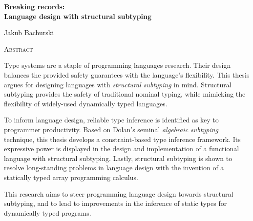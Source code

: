 \vspace*{2cm}
\begin{center}
  \Large
  \textbf{Breaking records: \\ Language design with structural subtyping}
\end{center}
\ifanonymised\else
\vspace{0.5cm}
\begin{center}
  \Large Jakub Bachurski
\end{center}
\fi
\vspace{1.5cm}
\begin{center}
  \Large
  \textsc{Abstract}
\end{center}
\vspace{0.2cm}
%
\begin{center}
\begin{minipage}{0.6\textwidth}
    \setlength{\parindent}{1em}
    Type systems are a staple of programming languages research. Their design balances the provided safety guarantees with the language's flexibility. This thesis argues for designing languages with \emph{structural subtyping} in mind. Structural subtyping provides the safety of traditional nominal typing, while mimicking the flexibility of widely-used dynamically typed languages. 

    To inform language design, reliable type inference is identified as key to programmer productivity. Based on Dolan's seminal \emph{algebraic subtyping} technique, this thesis develops a constraint-based type inference framework. Its expressive power is displayed in the design and implementation of a functional language with structural subtyping. Lastly, structural subtyping is shown to resolve long-standing problems in language design with the invention of a statically typed array programming calculus.

    This research aims to steer programming language design towards structural subtyping, and to lead to improvements in the inference of static types for dynamically typed programs.
\end{minipage}
\end{center}